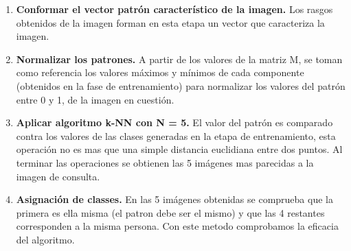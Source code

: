 \begin{enumerate}
\begin{enumerate}
	\end{enumerate}
	\item \textbf{Conformar el vector patr\'on caracter\'istico de la imagen.} Los rasgos obtenidos de la imagen forman en esta etapa un vector que caracteriza la imagen.	
	\item \textbf{Normalizar los patrones.} A partir de los valores de la matriz M, se toman como referencia los valores m\'aximos y m\'inimos de cada componente (obtenidos en la fase de entrenamiento) para normalizar los valores del patr\'on entre 0 y 1, de la imagen en cuesti\'on.
	\item \textbf{Aplicar algoritmo k-NN con N = 5.} El valor del patr\'on es comparado contra los valores de las clases generadas en la etapa de entrenamiento, esta operaci\'on no es mas que una simple distancia euclidiana entre dos puntos. Al terminar las operaciones se obtienen las 5 im\'agenes mas parecidas a la imagen de consulta.
	\item \textbf{Asignaci\'on de classes.} En las 5 im\'agenes obtenidas se comprueba que la primera es ella misma (el patron debe ser el mismo) y que las 4 restantes corresponden a la misma persona. Con este metodo comprobamos la eficacia del algoritmo.
\end{enumerate}



















